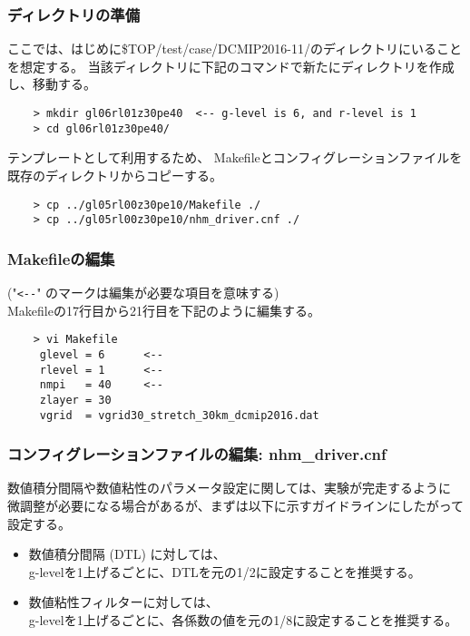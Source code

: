 \subsubsection{ディレクトリの準備}
 ここでは、はじめに\${TOP}/test/case/DCMIP2016-11/のディレクトリにいることを想定する。
当該ディレクトリに下記のコマンドで新たにディレクトリを作成し、移動する。
 \begin{verbatim}
    > mkdir gl06rl01z30pe40  <-- g-level is 6, and r-level is 1
    > cd gl06rl01z30pe40/
 \end{verbatim}

 \noindent テンプレートとして利用するため、
  Makefileとコンフィグレーションファイルを既存のディレクトリからコピーする。
 \begin{verbatim}
    > cp ../gl05rl00z30pe10/Makefile ./
    > cp ../gl05rl00z30pe10/nhm_driver.cnf ./
 \end{verbatim}

\subsubsection{Makefileの編集}
 ("\verb|<--|" のマークは編集が必要な項目を意味する) \\
 Makefileの17行目から21行目を下記のように編集する。
 \begin{verbatim}
    > vi Makefile
     glevel = 6      <--
     rlevel = 1      <--
     nmpi   = 40     <--
     zlayer = 30
     vgrid  = vgrid30_stretch_30km_dcmip2016.dat
 \end{verbatim}

\subsubsection{コンフィグレーションファイルの編集: nhm\_driver.cnf}
 \noindent 数値積分間隔や数値粘性のパラメータ設定に関しては、実験が完走するように
 微調整が必要になる場合があるが、まずは以下に示すガイドラインにしたがって設定する。

 \begin{itemize}
   \item 数値積分間隔 (DTL) に対しては、 \\
   {\sf g-levelを1上げるごとに、DTLを元の1/2に設定することを推奨する}。
   \item 数値粘性フィルターに対しては、 \\
   {\sf g-levelを1上げるごとに、各係数の値を元の1/8に設定することを推奨する}。 \\
 \end{itemize}

